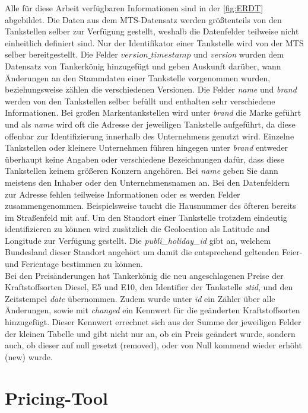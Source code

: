 Alle für diese Arbeit verfügbaren Informationen sind in der \autoref{fig:ERDT} abgebildet. Die Daten aus dem MTS-Datensatz werden größtenteils von den Tankstellen selber zur Verfügung gestellt, weshalb die Datenfelder teilweise nicht einheitlich definiert sind. Nur der Identifikator einer Tankstelle wird von der MTS selber bereitgestellt. Die Felder \textit{$version\_timestamp$} und \textit{version} wurden dem Datensatz von Tankerkönig hinzugefügt und geben Auskunft darüber, wann Änderungen an den Stammdaten einer Tankstelle vorgenommen wurden, beziehungsweise zählen die verschiedenen Versionen. Die Felder \textit{name} und \textit{brand} werden von den Tankstellen selber befüllt und enthalten sehr verschiedene Informationen. Bei großen Markentankstellen wird unter \textit{brand} die Marke geführt und als \textit{name} wird oft die Adresse der jeweiligen Tankstelle aufgeführt, da diese offenbar zur Identifizierung innerhalb des Unternehmens genutzt wird. Einzelne Tankstellen oder kleinere Unternehmen führen hingegen unter \textit{brand} entweder überhaupt keine Angaben oder verschiedene Bezeichnungen dafür, dass diese Tankstellen keinem größeren Konzern angehören. Bei \textit{name} geben Sie dann meistens den Inhaber oder den Unternehmensnamen an. Bei den Datenfeldern zur Adresse fehlen teilweise Informationen oder es werden Felder zusammengenommen. Beispielsweise taucht die Hausnummer des öfteren bereits im Straßenfeld mit auf. Um den Standort einer Tankstelle trotzdem eindeutig identifizieren zu können wird zusätzlich die Geolocation als Latitude and Longitude zur Verfügung gestellt. Die \textit{publi\_holiday\_id} gibt an, welchem Bundesland dieser Standort angehört um damit die entsprechend geltenden Feier- und Ferientage bestimmen zu können.\\
Bei den Preisänderungen hat Tankerkönig die neu angeschlagenen Preise der Kraftstoffsorten Diesel, E5 und E10, den Identifier der Tankstelle \textit{stid}, und den Zeitstempel \textit{date} übernommen. Zudem wurde unter \textit{id} ein Zähler über alle Änderungen, sowie mit \textit{changed} ein Kennwert für die geänderten Kraftstoffsorten hinzugefügt. Dieser Kennwert errechnet sich aus der Summe der jeweiligen Felder der kleinen Tabelle und gibt nicht nur an, ob ein Preis geändert wurde, sondern auch, ob dieser auf null gesetzt (removed), oder von Null kommend wieder erhöht (new) wurde.\\

\section{Pricing-Tool}

